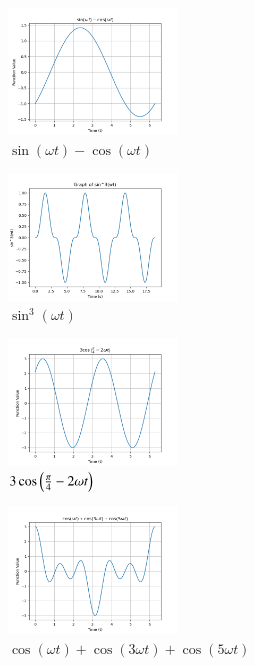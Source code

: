 \documentclass[journal,12pt,twocolumn]{IEEEtran}
\theoremstyle{remark}
\begin{document}
 
 \begin{figure}[h!]
    \centering
    \includegraphics[width=0.4\textwidth]{figs/a1_fig1.png}
    \caption{$\sin(\omega t)- \cos(\omega t)$}
\end{figure}
 \begin{figure}[h!]
    \centering
    \includegraphics[width=0.4\textwidth]{figs/a1_fig2.png}
    \caption{$\sin^3(\omega t)$}
\end{figure}
\begin{figure}[h!]
    \centering
    \includegraphics[width=0.4\textwidth]{figs/a1_fig3.png}
    \caption{$3\cos\left(\frac{\pi}{4}- 2\omega t\right)$}
\end{figure}
\begin{figure}[h!]
    \centering
    \includegraphics[width=0.4\textwidth]{figs/a1_fig4.png}
    \caption{$\cos(\omega t)+\cos(3\omega t)+\cos(5\omega t)$}
\end{figure}
\end{document}
